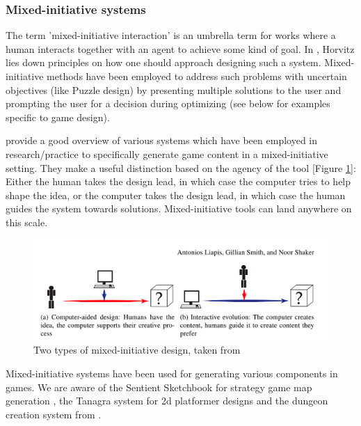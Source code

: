 \subsubsection{Mixed-initiative systems}
The term 'mixed-initiative interaction' is an umbrella term for works where a human interacts together with an agent to achieve some kind of goal. In \cite{Horvitz1999}, Horvitz lies down principles on how one should approach designing such a system. Mixed-initiative methods have been employed to address such problems with uncertain objectives (like Puzzle design) by presenting multiple solutions to the user and prompting the user for a decision during optimizing (see below for examples specific to game design). %

\cite{Liapis2016} provide a good overview of various systems which have been employed in research/practice to specifically generate game content in a mixed-initiative setting. They make a useful distinction based on the agency of the tool [Figure \ref{fig:mixedinitiativeimg}]: Either the human takes the design lead, in which case the computer tries to help shape the idea, or the computer takes the design lead, in which case the human guides the system towards solutions. Mixed-initiative tools can land anywhere on this scale.

\begin{figure}
    \centering
    \includegraphics[width=1.0\linewidth]{figures/cadvsinteractiveevol.png}
    
    \caption[Two types of mixed-initiative design]{ Two types of mixed-initiative design, taken from \cite{Liapis2016} %
      \label{fig:mixedinitiativeimg}}
\end{figure}

Mixed-initiative systems have been used for generating various components in games. We are aware of the Sentient Sketchbook for strategy game map generation \cite{Liapis2013}, the Tanagra system for 2d platformer designs  \cite{Smith2011} and the dungeon creation system from \cite{Baldwin2017}.

